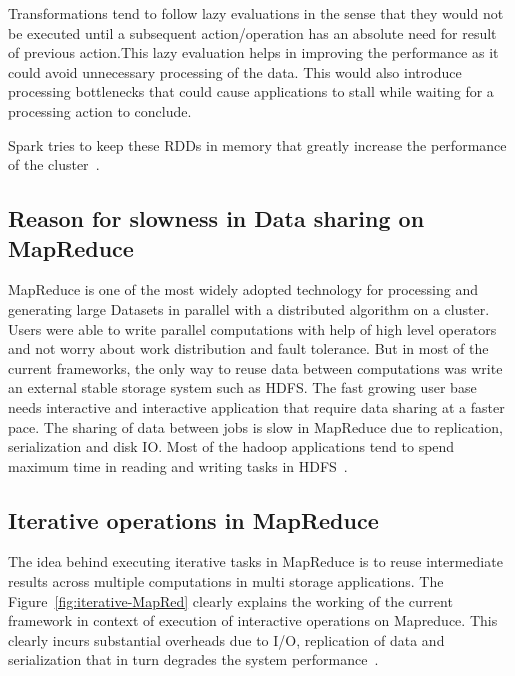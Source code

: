  Transformations tend to follow lazy evaluations in the sense that they would 
not be executed until a subsequent action/operation has an absolute need for 
result of previous action.This lazy evaluation helps in improving the 
performance as it could avoid unnecessary processing of the data. This would 
also introduce processing bottlenecks that could cause applications to stall 
while waiting for a processing action to conclude.

Spark tries to keep these RDDs in memory that greatly increase the performance 
of the cluster~\cite{hid-sp18-410-spark-RDD}.

\subsection{Reason for slowness in Data sharing on MapReduce}

MapReduce is one of the most widely adopted technology  for processing and 
generating large Datasets in parallel with a distributed algorithm on a cluster.
 Users were able to write parallel computations with help of high level 
 operators and not worry about work distribution and fault tolerance. But in 
 most of the current frameworks, the only way to reuse data between 
 computations was write an external stable storage system such as HDFS. 
The fast growing user base needs interactive and interactive application that 
require data sharing at a faster pace. The sharing of data between jobs is slow 
in MapReduce due to replication, serialization and disk IO. Most of the hadoop 
applications tend to spend maximum time in reading and 
writing tasks in HDFS~\cite{hid-sp18-410-spark-RDD}.

\subsection{Iterative operations in MapReduce}

The idea behind executing iterative tasks in MapReduce is to reuse intermediate 
results across multiple computations in multi storage applications. 
The Figure~\ref{fig:iterative-MapRed} clearly explains the working of the  
current framework in context of execution of interactive operations on 
Mapreduce. This clearly incurs substantial overheads due to I/O, replication of 
data and serialization that in turn degrades the system 
performance~\cite{hid-sp18-410-spark-RDD}. 


